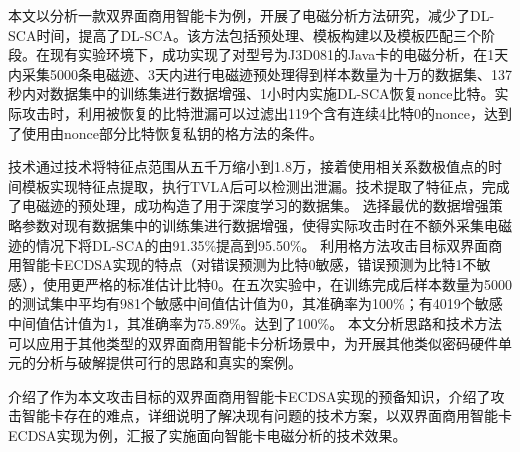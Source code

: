 {		
	本文以分析一款双界面商用智能卡为例，开展了电磁分析方法研究，减少了DL-SCA时间，提高了DL-SCA\zyx。该方法包括预处理、模板构建以及模板匹配三个阶段。在现有实验环境下，成功实现了对型号为J3D081的Java卡的电磁分析，在1天内采集5000条电磁迹、3天内进行电磁迹预处理得到样本数量为十万的数据集、137秒内对数据集中的训练集进行数据增强、1小时内实施DL-SCA恢复nonce比特。实际攻击时，利用被恢复的比特泄漏可以过滤出119个含有连续4比特0的nonce，达到了使用由nonce部分比特恢复私钥的格方法的条件。%
	
	\yuchuli 技术通过\poifanwei 技术将特征点范围从五千万缩小到1.8万，接着使用相关系数极值点的时间模板实现特征点提取，执行TVLA后可以检测出泄漏。\yuchuli 技术提取了特征点，完成了电磁迹的预处理，成功构造了用于深度学习的数据集。
	\shujuzengqiang 选择最优的数据增强策略参数对现有数据集中的训练集进行数据增强，使得实际攻击时在不额外采集电磁迹的情况下将DL-SCA的\zyx 由91.35\%提高到95.50\%。
	\jiashejianyanguji 利用格方法攻击目标双界面商用智能卡ECDSA实现的特点（对错误预测为比特0敏感，错误预测为比特1不敏感），使用更严格的标准估计比特0。在五次实验中，在训练完成后样本数量为5000的测试集中平均有981个敏感中间值估计值为0，其准确率为100\%；有4019个敏感中间值估计值为1，其准确率为75.89\%。\zyx 达到了100\%。
	本文分析思路和技术方法可以应用于其他类型的双界面商用智能卡分析场景中，为开展其他类似密码硬件单元的分析与破解提供可行的思路和真实的案例。
	
	介绍了作为本文攻击目标的双界面商用智能卡ECDSA实现的预备知识，介绍了攻击智能卡存在的难点，详细说明了解决现有问题的技术方案，以双界面商用智能卡ECDSA实现为例，汇报了实施面向智能卡电磁分析的技术效果。
	
}

